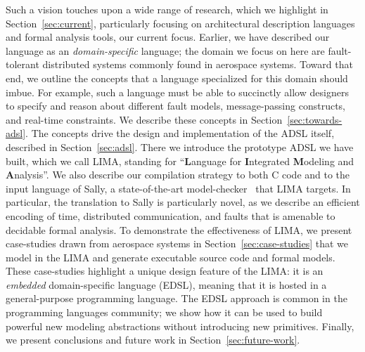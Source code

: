 Such a vision touches upon a wide range of research, which we highlight in
Section~\ref{sec:current}, particularly focusing on architectural description
languages and formal analysis tools, our current focus. Earlier, we have
described our language as an \emph{domain-specific} language; the domain we
focus on here are fault-tolerant distributed systems commonly found in aerospace
systems. Toward that end, we outline the concepts that a language specialized
for this domain should imbue. For example, such a language must be able to succinctly allow designers to specify and reason about different fault models, message-passing constructs, and real-time constraints. We describe these concepts in Section~\ref{sec:towards-adsl}. The concepts drive the design and implementation of the ADSL itself, described in Section~\ref{sec:adsl}. There we introduce the prototype ADSL we have built, which we call LIMA, standing for ``\textbf{L}anguage for \textbf{I}ntegrated \textbf{M}odeling and \textbf{A}nalysis''. We also describe our compilation strategy to both C code and to the input language of Sally, a state-of-the-art model-checker~\cite{sally} that LIMA targets. In particular, the translation to Sally is particularly novel, as we describe an efficient encoding of time, distributed communication, and faults that is amenable to decidable formal analysis. To demonstrate the effectiveness of LIMA, we present case-studies drawn from aerospace systems in Section~\ref{sec:case-studies} that we model in the LIMA and generate executable source code and formal models. These case-studies highlight a unique design feature of the LIMA: it is an \emph{embedded} domain-specific language (EDSL), meaning that it is hosted in a general-purpose programming language. The EDSL approach is common in the programming languages community; we show how it can be used to build powerful new modeling abstractions without introducing new primitives.
 Finally, we present conclusions and future work in Section~\ref{sec:future-work}.


